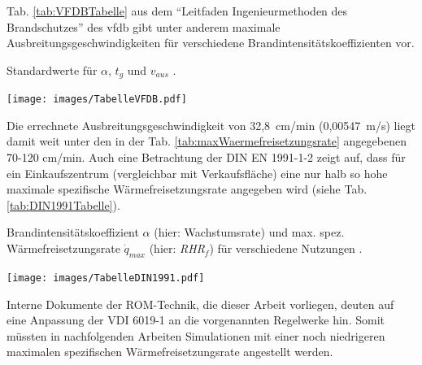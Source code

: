 Tab. \ref{tab:VFDBTabelle} aus dem "`Leitfaden Ingenieurmethoden des Brandschutzes"' des vfdb \cite{vfdb2013} gibt unter anderem maximale Ausbreitungsgeschwindigkeiten für verschiedene Brand\-in\-ten\-si\-täts\-ko\-ef\-fi\-zien\-ten vor. 
\begin{table}[h]
    \caption{Standardwerte für $\alpha$, $t_g$ und $v_{aus}$ \cite{vfdb2013}.}
    \centering
    \texttt{[image: images/TabelleVFDB.pdf]}
    \label{tab:VFDBTabelle}
\end{table}
Die errechnete Ausbreitungsgeschwindigkeit von 32,8~cm/min (0,00547~m/s) liegt damit weit unter den in der Tab. \ref{tab:maxWaermefreisetzungsrate} angegebenen 70-120 cm/min. Auch eine Betrachtung der DIN EN 1991-1-2 zeigt auf, dass für ein Einkaufszentrum (vergleichbar mit Verkaufsfläche) eine nur halb so hohe maximale spezifische Wärmefreisetzungsrate angegeben wird (siehe Tab. \ref{tab:DIN1991Tabelle}). 
\begin{table}
    \caption{Brandintensitätskoeffizient $\alpha$ (hier: Wachstumsrate) und max. spez. Wärmefreisetzungsrate $\Dot{q}_{max}$ (hier: \emph{RHR}$_f$) für verschiedene Nutzungen \cite{DIN1991}.}
    \centering
    \texttt{[image: images/TabelleDIN1991.pdf]}
    \label{tab:DIN1991Tabelle}
\end{table}
Interne Dokumente der ROM-Technik, die dieser Arbeit vorliegen, deuten auf eine Anpassung der VDI 6019-1 an die vorgenannten Regelwerke hin. Somit müssten in nachfolgenden Arbeiten Simulationen mit einer noch niedrigeren maximalen spezifischen Wärmefreisetzungsrate angestellt werden.

